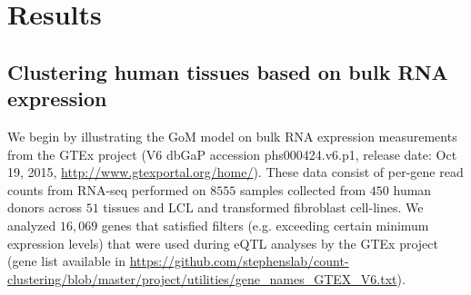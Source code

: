 \section{Results}

%
%
%
%
%
%
%
%
%
%
%

\subsection{Clustering human tissues based on bulk RNA expression}

We begin by illustrating the GoM model on bulk RNA expression measurements from the GTEx project (V6 dbGaP accession phs000424.v6.p1, release date: Oct 19, 2015, \url{http://www.gtexportal.org/home/}).  These data consist of per-gene read counts from RNA-seq performed on $8555$ samples collected from $450$ human donors across $51$ tissues and LCL and transformed fibroblast cell-lines. We analyzed $16,069$ genes that satisfied filters (e.g. exceeding certain minimum expression levels) that were used during eQTL analyses by the GTEx project (gene list available in \url{https://github.com/stephenslab/count-clustering/blob/master/project/utilities/gene_names_GTEX_V6.txt}). 

